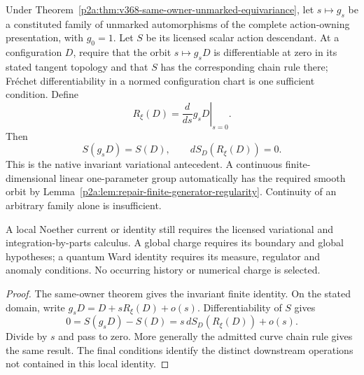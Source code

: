 \documentclass[12pt,a4paper]{article}
\begin{document}
\begin{corollary}
\label{p2a:cor:v368-native-noether-antecedent}
Under Theorem~\ref{p2a:thm:v368-same-owner-unmarked-equivariance}, let
$s\mapsto g_s$ be a constituted family of unmarked automorphisms of the
complete action-owning presentation, with $g_0=1$. Let $S$ be its licensed
scalar action descendant. At a configuration $D$, require that the orbit
$s\mapsto g_sD$ is differentiable at zero in its stated tangent topology and
that $S$ has the corresponding chain rule there; Fr\'echet differentiability
in a normed configuration chart is one sufficient condition. Define
\[
 R_\xi(D)=\left.\frac{d}{ds}g_sD\right|_{s=0}.
\]
Then
\[
 S(g_sD)=S(D),\qquad
 \boxed{dS_D(R_\xi(D))=0.}
\]
This is the native invariant variational antecedent. A continuous
finite-dimensional linear one-parameter group automatically has the required
smooth orbit by Lemma~\ref{p2a:lem:repair-finite-generator-regularity}.
Continuity of an arbitrary family alone is insufficient.

A local Noether current or identity still requires the licensed variational
and integration-by-parts calculus. A global charge requires its boundary and
global hypotheses; a quantum Ward identity requires its measure, regulator
and anomaly conditions. No occurring history or numerical charge is selected.
\end{corollary}
\begin{proof}
The same-owner theorem gives the invariant finite identity. On the stated
domain, write $g_sD=D+sR_\xi(D)+o(s)$. Differentiability of $S$ gives
\[
 0=S(g_sD)-S(D)=s\,dS_D(R_\xi(D))+o(s).
\]
Divide by $s$ and pass to zero. More generally the admitted curve chain rule
gives the same result. The final conditions identify the distinct downstream
operations not contained in this local identity.
\end{proof}
\end{document}
